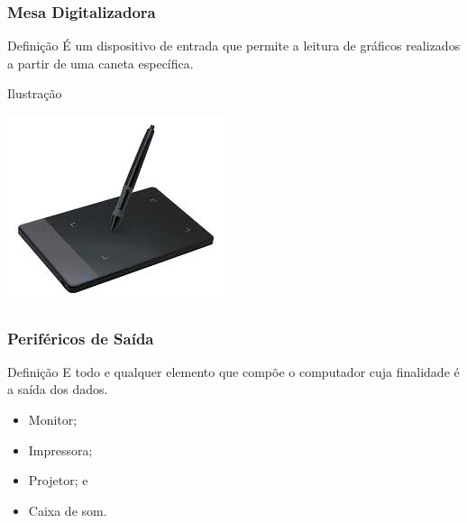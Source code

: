 \documentclass[aspectratio=169]{beamer} %
\begin{document}
\begin{frame}
	\frametitle{Mesa Digitalizadora}
	
	\begin{block}{Defini\c cão}
		É um dispositivo de entrada que permite a leitura de gráficos realizados a partir de uma caneta específica.
	\end{block}\vfill
	
	\begin{exampleblock}{Ilustra\c cão}
		\begin{center}
			\includegraphics[scale=0.5]{img/mesa_digitalizadora}
		\end{center}		
	\end{exampleblock}
\end{frame}


\begin{frame}
	\frametitle{Periféricos de Saída}
	
	\begin{block}{Defini\c cão}
		E todo e qualquer elemento que compõe o computador cuja finalidade é a saída dos dados.
	\end{block}\vfill
	
	\begin{itemize}
		\item Monitor;
		\item Impressora; 
		\item Projetor; e
		\item Caixa de som.
	\end{itemize}
\end{frame}
\end{document}
